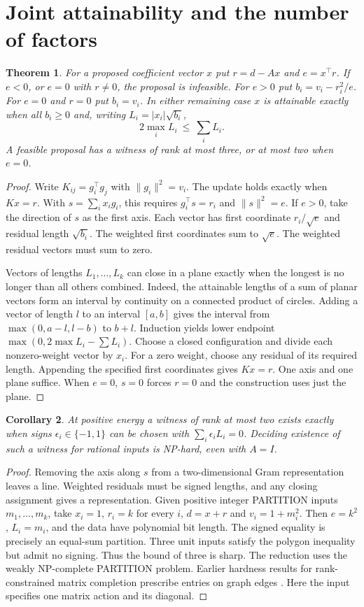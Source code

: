 \documentclass[11pt]{article}
\newtheorem{theorem}{Theorem}
\newtheorem{corollary}[theorem]{Corollary}
\begin{document}
\section{Joint attainability and the number of factors}
\begin{theorem}\label{th:joint}
For a proposed coefficient vector $x$ put $r=d-Ax$ and $e=x^\top r$. If $e<0$, or $e=0$ with $r\ne0$, the proposal is infeasible. For $e>0$ put $b_i=v_i-r_i^2/e$. For $e=0$ and $r=0$ put $b_i=v_i$. In either remaining case $x$ is attainable exactly when all $b_i\ge0$ and, writing $L_i=|x_i|\sqrt{b_i}$,
\[
                       2\max_i L_i\ \le\ \sum_i L_i .
\]
A feasible proposal has a witness of rank at most three, or at most two when $e=0$.
\end{theorem}
\begin{proof}
Write $K_{ij}=g_i^\top g_j$ with $\|g_i\|^2=v_i$. The update holds exactly when $Kx=r$. With $s=\sum_i x_i g_i$, this requires $g_i^\top s=r_i$ and $\|s\|^2=e$. If $e>0$, take the direction of $s$ as the first axis. Each vector has first coordinate $r_i/\sqrt e$ and residual length $\sqrt{b_i}$. The weighted first coordinates sum to $\sqrt e$. The weighted residual vectors must sum to zero.

Vectors of lengths $L_1,\ldots,L_k$ can close in a plane exactly when the longest is no longer than all others combined. Indeed, the attainable lengths of a sum of planar vectors form an interval by continuity on a connected product of circles. Adding a vector of length $l$ to an interval $[a,b]$ gives the interval from $\max(0,a-l,l-b)$ to $b+l$. Induction yields lower endpoint $\max(0,2\max L_i-\sum L_i)$. Choose a closed configuration and divide each nonzero-weight vector by $x_i$. For a zero weight, choose any residual of its required length. Appending the specified first coordinates gives $Kx=r$. One axis and one plane suffice. When $e=0$, $s=0$ forces $r=0$ and the construction uses just the plane.
\end{proof}

\begin{corollary}\label{cor:rank}
At positive energy a witness of rank at most two exists exactly when signs $\epsilon_i\in\{-1,1\}$ can be chosen with $\sum_i\epsilon_i L_i=0$. Deciding existence of such a witness for rational inputs is NP-hard, even with $A=I$.
\end{corollary}
\begin{proof}
Removing the axis along $s$ from a two-dimensional Gram representation leaves a line. Weighted residuals must be signed lengths, and any closing assignment gives a representation. Given positive integer PARTITION inputs $m_1,\ldots,m_k$, take $x_i=1$, $r_i=k$ for every $i$, $d=x+r$ and $v_i=1+m_i^2$. Then $e=k^2$, $L_i=m_i$, and the data have polynomial bit length. The signed equality is precisely an equal-sum partition. Three unit inputs satisfy the polygon inequality but admit no signing. Thus the bound of three is sharp. The reduction uses the weakly NP-complete PARTITION problem. Earlier hardness results for rank-constrained matrix completion prescribe entries on graph edges \cite{rank}. Here the input specifies one matrix action and its diagonal.
\end{proof}
\end{document}
